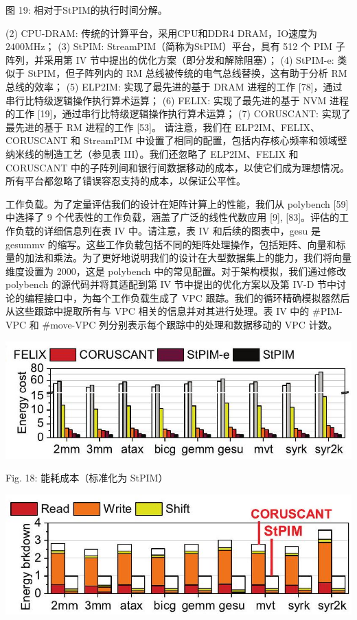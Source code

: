 \documentclass[10pt]{article}
\begin{document}
图 19: 相对于StPIM的执行时间分解。

(2) CPU-DRAM: 传统的计算平台，采用CPU和DDR4 DRAM，IO速度为 $2400 \mathrm{MHz}$；
(3) StPIM: StreamPIM（简称为StPIM）平台，具有 512 个 PIM 子阵列，并采用第 IV 节中提出的优化方案（即分发和解除阻塞）；
(4) StPIM-e: 类似于 StPIM，但子阵列内的 RM 总线被传统的电气总线替换，这有助于分析 RM 总线的效率；
(5) ELP2IM: 实现了最先进的基于 DRAM 进程的工作 [78]，通过串行比特级逻辑操作执行算术运算；
(6) FELIX: 实现了最先进的基于 NVM 进程的工作 [19]，通过串行比特级逻辑操作执行算术运算；
(7) CORUSCANT: 实现了最先进的基于 RM 进程的工作 [53]。
请注意，我们在 ELP2IM、FELIX、CORUSCANT 和 StreamPIM 中设置了相同的配置，包括内存核心频率和领域壁纳米线的制造工艺（参见表 III）。我们还忽略了 ELP2IM、FELIX 和 CORUSCANT 中的子阵列间和银行间数据移动的成本，以使它们成为理想情况。所有平台都忽略了错误容忍支持的成本，以保证公平性。

工作负载。为了定量评估我们的设计在矩阵计算上的性能，我们从 polybench [59] 中选择了 9 个代表性的工作负载，涵盖了广泛的线性代数应用 [9], [83]。评估的工作负载的详细信息列在表 IV 中。请注意，表 IV 和后续的图表中，gesu 是 gesummv 的缩写。这些工作负载包括不同的矩阵处理操作，包括矩阵、向量和标量的加法和乘法。为了更好地说明我们的设计在大型数据集上的能力，我们将向量维度设置为 2000，这是 polybench 中的常见配置。对于架构模拟，我们通过修改 polybench 的源代码并将其适配到第 IV 节中提出的优化方案以及第 IV-D 节中讨论的编程接口中，为每个工作负载生成了 VPC 跟踪。我们的循环精确模拟器然后从这些跟踪中提取所有与 VPC 相关的信息并对其进行处理。表 IV 中的 #PIM-VPC 和 #move-VPC 列分别表示每个跟踪中的处理和数据移动的 VPC 计数。

\begin{center}
\includegraphics[max width=\textwidth]{2024_05_12_abeba8a85da5b5ec4c7bg-10}
\end{center}

Fig. 18: 能耗成本（标准化为 StPIM）

\begin{center}
\includegraphics[max width=\textwidth]{2024_05_12_abeba8a85da5b5ec4c7bg-10(2)}
\end{center}
\end{document}
